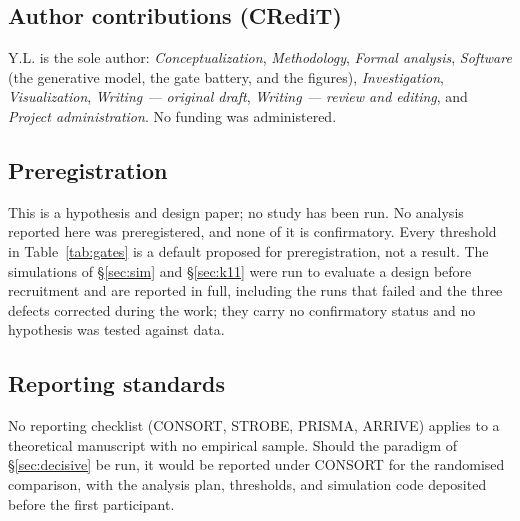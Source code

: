 \documentclass[9pt,twocolumn]{article}
\begin{document}
\subsection*{Author contributions (CRediT)}
Y.L. is the sole author: \emph{Conceptualization}, \emph{Methodology}, \emph{Formal analysis}, \emph{Software} (the generative model, the gate battery, and the figures), \emph{Investigation}, \emph{Visualization}, \emph{Writing --- original draft}, \emph{Writing --- review and editing}, and \emph{Project administration}. No funding was administered.

\subsection*{Preregistration}
This is a hypothesis and design paper; no study has been run. No analysis reported here was preregistered, and none of it is confirmatory. Every threshold in Table~\ref{tab:gates} is a default proposed for preregistration, not a result. The simulations of \S\ref{sec:sim} and \S\ref{sec:k11} were run to evaluate a design before recruitment and are reported in full, including the runs that failed and the three defects corrected during the work; they carry no confirmatory status and no hypothesis was tested against data.

\subsection*{Reporting standards}
No reporting checklist (CONSORT, STROBE, PRISMA, ARRIVE) applies to a theoretical manuscript with no empirical sample. Should the paradigm of \S\ref{sec:decisive} be run, it would be reported under CONSORT for the randomised comparison, with the analysis plan, thresholds, and simulation code deposited before the first participant.
\end{document}
